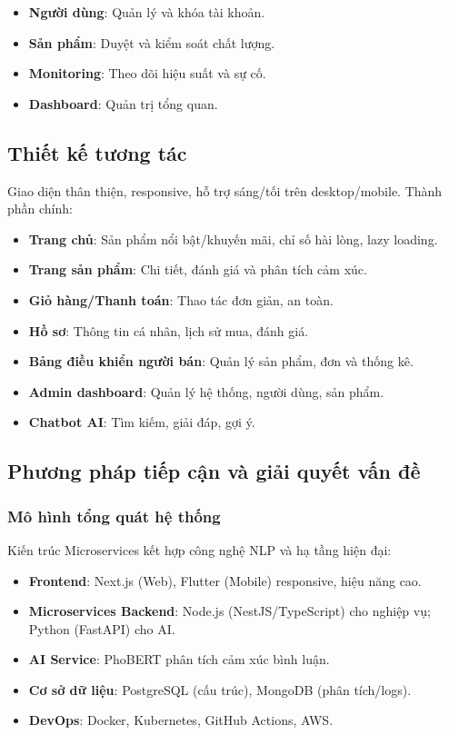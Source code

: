 \begin{itemize}
    \item \textbf{Người dùng}: Quản lý và khóa tài khoản.
    \item \textbf{Sản phẩm}: Duyệt và kiểm soát chất lượng.
    \item \textbf{Monitoring}: Theo dõi hiệu suất và sự cố.
    \item \textbf{Dashboard}: Quản trị tổng quan.
\end{itemize}

\subsection{Thiết kế tương tác}
Giao diện thân thiện, responsive, hỗ trợ sáng/tối trên desktop/mobile. Thành phần chính:
\begin{itemize}
    \item \textbf{Trang chủ}: Sản phẩm nổi bật/khuyến mãi, chỉ số hài lòng, lazy loading.
    \item \textbf{Trang sản phẩm}: Chi tiết, đánh giá và phân tích cảm xúc.
    \item \textbf{Giỏ hàng/Thanh toán}: Thao tác đơn giản, an toàn.
    \item \textbf{Hồ sơ}: Thông tin cá nhân, lịch sử mua, đánh giá.
    \item \textbf{Bảng điều khiển người bán}: Quản lý sản phẩm, đơn và thống kê.
    \item \textbf{Admin dashboard}: Quản lý hệ thống, người dùng, sản phẩm.
    \item \textbf{Chatbot AI}: Tìm kiếm, giải đáp, gợi ý.
\end{itemize}

\subsection{Phương pháp tiếp cận và giải quyết vấn đề}
\subsubsection{Mô hình tổng quát hệ thống}
Kiến trúc Microservices kết hợp công nghệ NLP và hạ tầng hiện đại:
\begin{itemize}
    \item \textbf{Frontend}: Next.js (Web), Flutter (Mobile) responsive, hiệu năng cao.
    \item \textbf{Microservices Backend}: Node.js (NestJS/TypeScript) cho nghiệp vụ; Python (FastAPI) cho AI.
    \item \textbf{AI Service}: PhoBERT phân tích cảm xúc bình luận.
    \item \textbf{Cơ sở dữ liệu}: PostgreSQL (cấu trúc), MongoDB (phân tích/logs).
    \item \textbf{DevOps}: Docker, Kubernetes, GitHub Actions, AWS.
\end{itemize}


